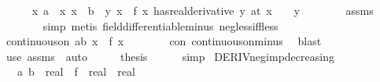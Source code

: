 \begin{isabellebody}
\ \ \ \ \isamarkupfalse%
\ {\isachardoublequoteopen}{\isasymAnd}x{\isachardot}{\kern0pt}\ {\isasymlbrakk}a\ {\isacharless}{\kern0pt}\ x{\isacharsemicolon}{\kern0pt}\ x\ {\isacharless}{\kern0pt}\ b{\isasymrbrakk}\ {\isasymLongrightarrow}\ {\isasymexists}y{\isachardot}{\kern0pt}\ {\isacharparenleft}{\kern0pt}{\isacharparenleft}{\kern0pt}{\isasymlambda}x{\isachardot}{\kern0pt}\ {\isacharminus}{\kern0pt}\ f\ x{\isacharparenright}{\kern0pt}\ has{\isacharunderscore}{\kern0pt}real{\isacharunderscore}{\kern0pt}derivative\ y{\isacharparenright}{\kern0pt}\ {\isacharparenleft}{\kern0pt}at\ x{\isacharparenright}{\kern0pt}\ {\isasymand}\ {}\ {\isacharless}{\kern0pt}\ y{\isachardoublequoteclose}\isanewline
\ \ \ \ \ \ \isamarkupfalse%
\ assms\isanewline
\ \ \ \ \ \ \isamarkupfalse%
\ simp\ {\isacharparenleft}{\kern0pt}metis\ field{\isacharunderscore}{\kern0pt}differentiable{\isacharunderscore}{\kern0pt}minus\ neg{\isacharunderscore}{\kern0pt}{}{\isacharunderscore}{\kern0pt}less{\isacharunderscore}{\kern0pt}iff{\isacharunderscore}{\kern0pt}less{\isacharparenright}{\kern0pt}\isanewline
\ \ \ \ \isamarkupfalse%
\ {\isachardoublequoteopen}continuous{\isacharunderscore}{\kern0pt}on\ {\isacharbraceleft}{\kern0pt}a{\isachardot}{\kern0pt}{\isachardot}{\kern0pt}b{\isacharbraceright}{\kern0pt}\ {\isacharparenleft}{\kern0pt}{\isasymlambda}x{\isachardot}{\kern0pt}\ {\isacharminus}{\kern0pt}\ f\ x{\isacharparenright}{\kern0pt}{\isachardoublequoteclose}\isanewline
\ \ \ \ \ \ \isamarkupfalse%
\ con\ continuous{\isacharunderscore}{\kern0pt}on{\isacharunderscore}{\kern0pt}minus\ \isamarkupfalse%
\ blast\isanewline
\ \ \isamarkupfalse%
\ {\isacharparenleft}{\kern0pt}use\ assms\ \ auto{\isacharparenright}{\kern0pt}\isanewline
\ \ \isamarkupfalse%
\ \isamarkupfalse%
\ {\isacharquery}{\kern0pt}thesis\isanewline
\ \ \ \ \isamarkupfalse%
\ simp\isanewline
{}\isamarkupfalse%
%
\endisatagproof
{\isafoldproof}%
%
\isadelimproof
\isanewline
%
\endisadelimproof
\isanewline
{}\isamarkupfalse%
\ DERIV{\isacharunderscore}{\kern0pt}neg{\isacharunderscore}{\kern0pt}imp{\isacharunderscore}{\kern0pt}decreasing{\isacharcolon}{\kern0pt}\isanewline
\ \ \ a\ b\ {\isacharcolon}{\kern0pt}{\isacharcolon}{\kern0pt}\ real\ \ f\ {\isacharcolon}{\kern0pt}{\isacharcolon}{\kern0pt}\ {\isachardoublequoteopen}real\ {\isasymRightarrow}\ real{\isachardoublequoteclose}\isanewline

\end{isabellebody}
